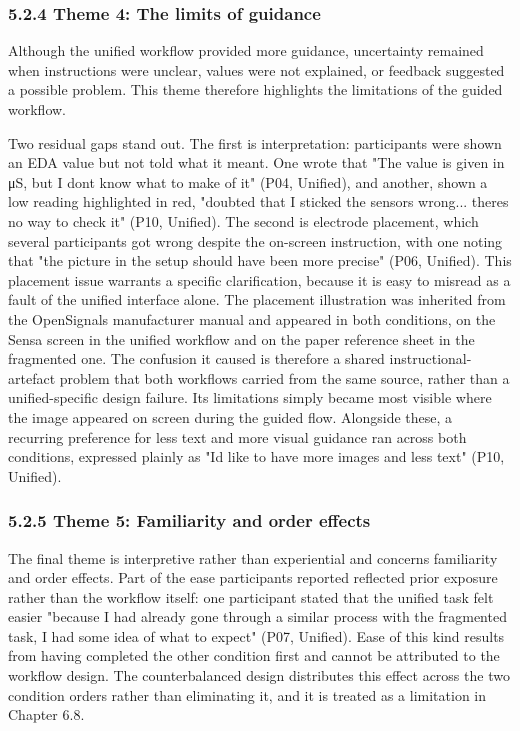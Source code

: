 \documentclass[
]{article}
\begin{document}
\hypertarget{theme-4-the-limits-of-guidance}{%
\subsubsection{5.2.4 Theme 4: The limits of guidance}\label{theme-4-the-limits-of-guidance}}

Although the unified workflow provided more guidance, uncertainty remained when instructions were unclear, values were not explained, or feedback suggested a possible problem. This theme therefore highlights the limitations of the guided workflow.

Two residual gaps stand out. The first is interpretation: participants were shown an EDA value but not told what it meant. One wrote that "The value is given in μS, but I don\textquotesingle t know what to make of it" (P04, Unified), and another, shown a low reading highlighted in red, "doubted that I sticked the sensors wrong... there\textquotesingle s no way to check it" (P10, Unified). The second is electrode placement, which several participants got wrong despite the on-screen instruction, with one noting that "the picture in the setup should have been more precise" (P06, Unified). This placement issue warrants a specific clarification, because it is easy to misread as a fault of the unified interface alone. The placement illustration was inherited from the OpenSignals manufacturer manual and appeared in both conditions, on the Sensa screen in the unified workflow and on the paper reference sheet in the fragmented one. The confusion it caused is therefore a shared instructional-artefact problem that both workflows carried from the same source, rather than a unified-specific design failure. Its limitations simply became most visible where the image appeared on screen during the guided flow. Alongside these, a recurring preference for less text and more visual guidance ran across both conditions, expressed plainly as "I\textquotesingle d like to have more images and less text" (P10, Unified).

\hypertarget{theme-5-familiarity-and-order-effects}{%
\subsubsection{\texorpdfstring{5.2.5 Theme 5: Familiarity and order effects }{5.2.5 Theme 5: Familiarity and order effects }}\label{theme-5-familiarity-and-order-effects}}

The final theme is interpretive rather than experiential and concerns familiarity and order effects. Part of the ease participants reported reflected prior exposure rather than the workflow itself: one participant stated that the unified task felt easier "because I had already gone through a similar process with the fragmented task, I had some idea of what to expect" (P07, Unified). Ease of this kind results from having completed the other condition first and cannot be attributed to the workflow design. The counterbalanced design distributes this effect across the two condition orders rather than eliminating it, and it is treated as a limitation in Chapter 6.8.
\end{document}
